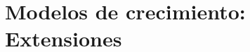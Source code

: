 \documentclass[DeGregorioResumen]{subfiles}
\begin{document}
\section{Modelos de crecimiento: Extensiones}
\end{document}
